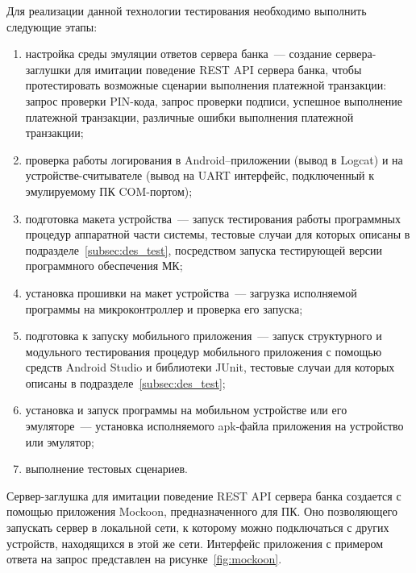 Для реализации данной технологии тестирования необходимо выполнить следующие этапы:

\begin{enumerate}
	\item настройка среды эмуляции ответов сервера банка~--- создание сервера-заглушки для имитации поведение REST API сервера банка, чтобы протестировать возможные сценарии выполнения платежной транзакции: запрос проверки PIN-кода, запрос проверки подписи, успешное выполнение платежной транзакции, различные ошибки выполнения платежной транзакции;
	\item проверка работы логирования в Android--приложении (вывод в Logcat) и на устройстве-считывателе (вывод на UART интерфейс, подключенный к эмулируемому ПК COM-портом);

	\item подготовка макета устройства~--- запуск тестирования работы программных процедур аппаратной части системы, тестовые случаи для которых описаны в подразделе~\ref{subsec:des_test}, посредством запуска тестирующей версии программного обеспечения МК;
	\item установка прошивки на макет устройства~--- загрузка исполняемой программы на микроконтроллер и проверка его запуска;

	\item подготовка к запуску мобильного приложения~--- запуск структурного и модульного тестирования процедур мобильного приложения с помощью средств Android Studio и библиотеки JUnit, тестовые случаи для которых описаны в подразделе~\ref{subsec:des_test};
	\item установка и запуск программы на мобильном устройстве или его эмуляторе~--- установка исполняемого apk-файла приложения на устройство или эмулятор;

	\item выполнение тестовых сценариев.
\end{enumerate}

Сервер-заглушка для имитации поведение REST API сервера банка создается с помощью приложения Mockoon, предназначенного для ПК.
Оно позволяющего запускать сервер в локальной сети, к которому можно подключаться с других устройств, находящихся в этой же сети.
Интерфейс приложения с примером ответа на запрос представлен на рисунке~\ref{fig:mockoon}.

